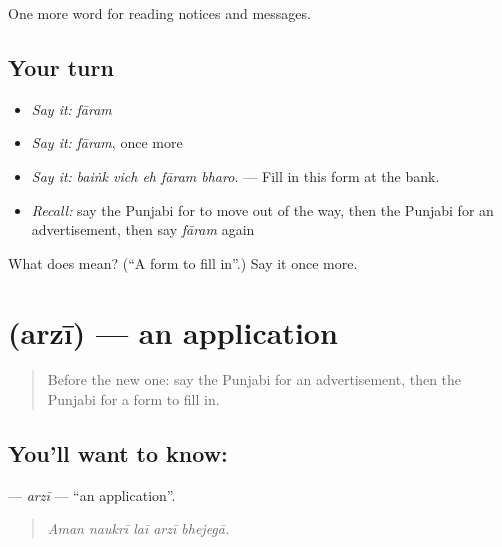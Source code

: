 \begin{grammarlens}[title={What you've built}]
One more word for reading notices and messages.
\end{grammarlens}

\subsection*{Your turn}
\begin{itemize}
\raggedright
  \item \emph{Say it:} \emph{fāram}
  \item \emph{Say it:} \emph{fāram}, once more
  \item \emph{Say it:} \emph{baiṅk vich eh fāram bharo.} — Fill in this form at the bank.
  \item \emph{Recall:} say the Punjabi for to move out of the way, then the Punjabi for an advertisement, then say \emph{fāram} again
\end{itemize}

\begin{tcolorbox}[breakable,colback=teal!4,colframe=teal!35!black,title={Before you move on}]
What does  mean? (\textquotedblleft{}A form to fill in\textquotedblright{}.) Say it once more.
\end{tcolorbox}
\section[\texorpdfstring{\pa{ਅਰਜ਼ੀ} (arzī)}{ਅਰਜ਼ੀ (arzī)}]{ (arzī) — an application}

\label{lesson:PA-C254-arzi}



\begin{quote}
Before the new one: say the Punjabi for an advertisement, then the Punjabi for a form to fill in.
\end{quote}

\subsection*{You'll want to know: }
\textbf{} — \emph{arzī} — \textquotedblleft{}an application\textquotedblright{}.

\begin{quote}
    
\end{quote}

\begin{quote}
\emph{Aman naukrī laī arzī bhejegā.}
\end{quote}

